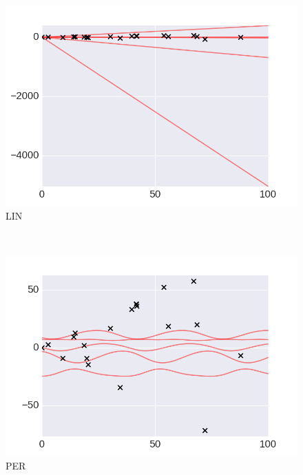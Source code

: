  \centering
     \begin{subfigure}[b]{0.3\textwidth}
        \includegraphics[width=\textwidth]{figs/composition/composition_demo_LIN_prior.png}
        \caption{LIN}
    \end{subfigure}
    ~ %
    \begin{subfigure}[b]{0.3\textwidth}
        \includegraphics[width=\textwidth]{figs/composition/composition_demo_PER_prior.png}
        \caption{PER}
    \end{subfigure}
    ~ %
